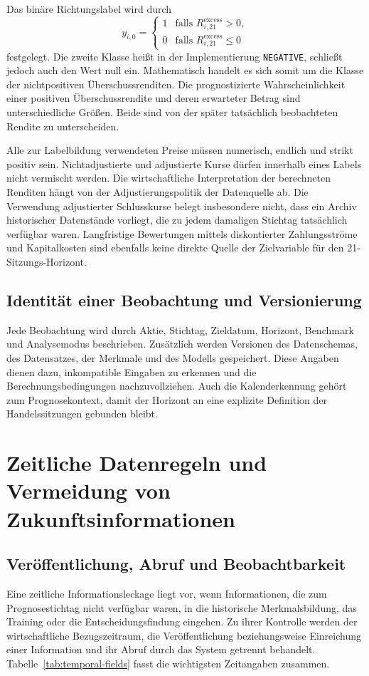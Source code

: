 Das binäre Richtungslabel wird durch
\begin{equation}
 y_{i,0}=\begin{cases}
 1 & \text{falls } R^{\mathrm{excess}}_{i,21}>0,\\
 0 & \text{falls } R^{\mathrm{excess}}_{i,21}\leq 0
 \end{cases}
 \label{eq:direction-label}
\end{equation}
festgelegt. Die zweite Klasse heißt in der Implementierung \texttt{NEGATIVE}, schließt jedoch auch den Wert null ein. Mathematisch handelt es sich somit um die Klasse der nichtpositiven Überschussrenditen. Die prognostizierte Wahrscheinlichkeit einer positiven Überschussrendite und deren erwarteter Betrag sind unterschiedliche Größen. Beide sind von der später tatsächlich beobachteten Rendite zu unterscheiden.

Alle zur Labelbildung verwendeten Preise müssen numerisch, endlich und strikt positiv sein. Nichtadjustierte und adjustierte Kurse dürfen innerhalb eines Labels nicht vermischt werden. Die wirtschaftliche Interpretation der berechneten Renditen hängt von der Adjustierungspolitik der Datenquelle ab. Die Verwendung adjustierter Schlusskurse belegt insbesondere nicht, dass ein Archiv historischer Datenstände vorliegt, die zu jedem damaligen Stichtag tatsächlich verfügbar waren. Langfristige Bewertungen mittels diskontierter Zahlungsströme und Kapitalkosten sind ebenfalls keine direkte Quelle der Zielvariable für den 21-Sitzungs-Horizont.

\subsection{Identität einer Beobachtung und Versionierung}
Jede Beobachtung wird durch Aktie, Stichtag, Zieldatum, Horizont, Benchmark und Analysemodus beschrieben. Zusätzlich werden Versionen des Datenschemas, des Datensatzes, der Merkmale und des Modells gespeichert. Diese Angaben dienen dazu, inkompatible Eingaben zu erkennen und die Berechnungsbedingungen nachzuvollziehen. Auch die Kalenderkennung gehört zum Prognosekontext, damit der Horizont an eine explizite Definition der Handelssitzungen gebunden bleibt.

\section{Zeitliche Datenregeln und Vermeidung von Zukunftsinformationen}
\label{sec:temporal-policy}
\subsection{Veröffentlichung, Abruf und Beobachtbarkeit}
Eine zeitliche Informationsleckage liegt vor, wenn Informationen, die zum Prognosestichtag nicht verfügbar waren, in die historische Merkmalsbildung, das Training oder die Entscheidungsfindung eingehen. Zu ihrer Kontrolle werden der wirtschaftliche Bezugszeitraum, die Veröffentlichung beziehungsweise Einreichung einer Information und ihr Abruf durch das System getrennt behandelt. Tabelle~\ref{tab:temporal-fields} fasst die wichtigsten Zeitangaben zusammen.


